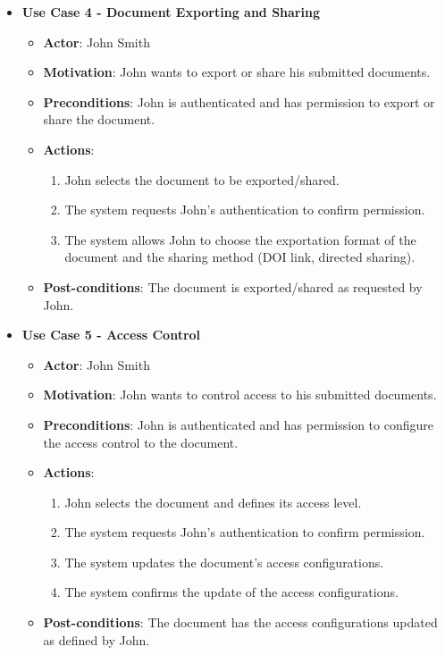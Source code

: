 \documentclass[a4paper,11pt]{article}
\begin{document}
\begin{itemize}
            \item \textbf{Use Case 4 - Document Exporting and Sharing}
            \begin{itemize}
                \item \textbf{Actor}: John Smith
                \item \textbf{Motivation}: John wants to export or share his submitted documents.
                \item \textbf{Preconditions}: John is authenticated and has permission to export or share the document.
                \item \textbf{Actions}:
                \begin{enumerate}
                    \item John selects the document to be exported/shared.
                    \item The system requests John’s authentication to confirm permission.
                    \item The system allows John to choose the exportation format of the document and the sharing method (DOI link, directed sharing).
                \end{enumerate}
                \item \textbf{Post-conditions}: The document is exported/shared as requested by John.
            \end{itemize}
            
            \item \textbf{Use Case 5 - Access Control}
            \begin{itemize}
                \item \textbf{Actor}: John Smith
                \item \textbf{Motivation}: John wants to control access to his submitted documents.
                \item \textbf{Preconditions}: John is authenticated and has permission to configure the access control to the document.
                \item \textbf{Actions}:
                \begin{enumerate}
                    \item John selects the document and defines its access level.
                    \item The system requests John’s authentication to confirm permission.
                    \item The system updates the document’s access configurations.
                    \item The system confirms the update of the access configurations.
                \end{enumerate}
                \item \textbf{Post-conditions}: The document has the access configurations updated as defined by John.
            \end{itemize}
            

\end{itemize}
\end{document}
